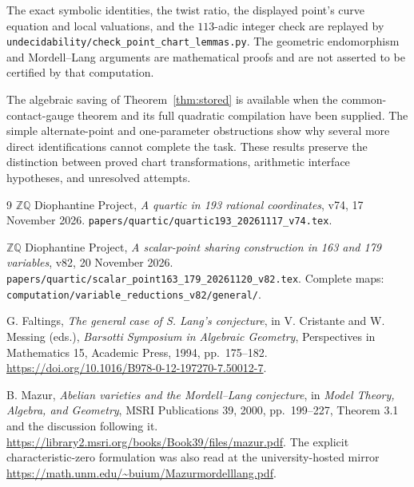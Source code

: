 \documentclass[11pt]{article}
\begin{document}
The exact symbolic identities, the twist ratio,
the displayed point's curve equation and local
valuations, and the \(113\)-adic integer check
are replayed by
\nolinkurl{undecidability/check_point_chart_lemmas.py}.
The geometric endomorphism and Mordell--Lang
arguments are mathematical proofs and are not
asserted to be certified by that computation.

The algebraic saving of
Theorem~\ref{thm:stored} is available when the
common-contact-gauge theorem and its full
quadratic compilation have been supplied.
The simple alternate-point and one-parameter
obstructions show why several more direct
identifications cannot complete the task.
These results preserve the distinction between
proved chart transformations, arithmetic
interface hypotheses, and unresolved attempts.

\begin{thebibliography}{9}
\(\mathbb Z\mathbb Q\) Diophantine Project,
\emph{A quartic in 193 rational coordinates},
v74, 17 November 2026.
\nolinkurl{papers/quartic/quartic193_20261117_v74.tex}.

\(\mathbb Z\mathbb Q\) Diophantine Project,
\emph{A scalar-point sharing construction in 163
and 179 variables}, v82, 20 November 2026.
\nolinkurl{papers/quartic/scalar_point163_179_20261120_v82.tex}.
Complete maps:
\nolinkurl{computation/variable_reductions_v82/general/}.

G. Faltings, \emph{The general case of S. Lang's
conjecture}, in V. Cristante and W. Messing (eds.),
\emph{Barsotti Symposium in Algebraic Geometry},
Perspectives in Mathematics 15, Academic Press,
1994, pp.\ 175--182.
\url{https://doi.org/10.1016/B978-0-12-197270-7.50012-7}.

B. Mazur, \emph{Abelian varieties and the
Mordell--Lang conjecture}, in
\emph{Model Theory, Algebra, and Geometry},
MSRI Publications 39, 2000, pp.\ 199--227,
Theorem 3.1 and the discussion following it.
\url{https://library2.msri.org/books/Book39/files/mazur.pdf}.
The explicit characteristic-zero formulation
was also read at the university-hosted mirror
\url{https://math.unm.edu/~buium/Mazurmordelllang.pdf}.
\end{thebibliography}
\end{document}
